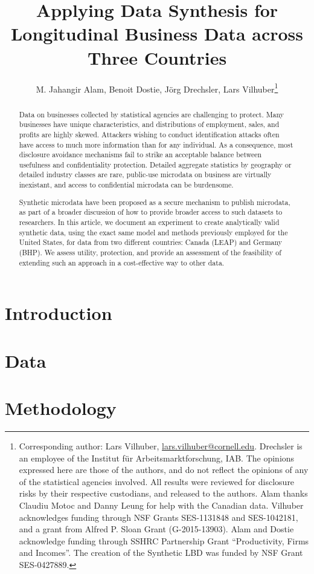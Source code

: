 \documentclass{article}
\title{Applying Data Synthesis for Longitudinal Business Data across Three Countries }
\author{M. Jahangir Alam, Benoit Dostie, J\"org Drechsler, Lars Vilhuber\thanks{Corresponding author: Lars Vilhuber, \href{mailto:lars.vilhuber@cornell.edu}{lars.vilhuber@cornell.edu}. Drechsler is an employee of the Institut f\"ur Arbeitsmarktforschung, IAB. The opinions expressed here are those of the authors, and do not reflect the opinions of any of the statistical agencies involved. All results were reviewed for disclosure risks by their respective custodians, and released to the authors. Alam thanks Claudiu Motoc and Danny Leung for help with the Canadian data. Vilhuber acknowledges funding through NSF Grants SES-1131848 and SES-1042181, and a grant from Alfred P. Sloan Grant (G-2015-13903). Alam and Dostie acknowledge funding through SSHRC Partnership Grant ``Productivity, Firms and Incomes''. The creation of the Synthetic LBD  was funded by NSF Grant SES-0427889.}}
\begin{document}
\maketitle
{}
\begin{abstract}
\noindent
Data on businesses collected by statistical agencies are challenging to protect. Many businesses have unique characteristics, and distributions of employment, sales, and profits are highly skewed. Attackers wishing to conduct identification attacks often have access to much more information than for any individual. As a consequence, most disclosure avoidance mechanisms  fail to strike an acceptable balance between usefulness and confidentiality protection. Detailed aggregate statistics by geography or detailed industry classes  are rare, public-use microdata on business are virtually inexistant, and access to confidential microdata can be burdensome. 

Synthetic microdata have been proposed as a secure mechanism to publish microdata, as part of a broader discussion of how  to provide broader access to such datasets to researchers.
In this article, we document an experiment to create analytically valid synthetic data, using the exact same model and methods previously employed for the United States, for data from two different countries: Canada (\ac{LEAP}) and Germany (\ac{BHP}). We assess utility, protection, and provide an assessment of the feasibility of extending such an approach in a cost-effective way to other data.

\end{abstract}


\newpage
\tableofcontents
\newpage
\acresetall
\section{Introduction}


\section{Data} 
\label{sec:data}


%

\section{Methodology}
\label{sec:methodology}

\end{document}
